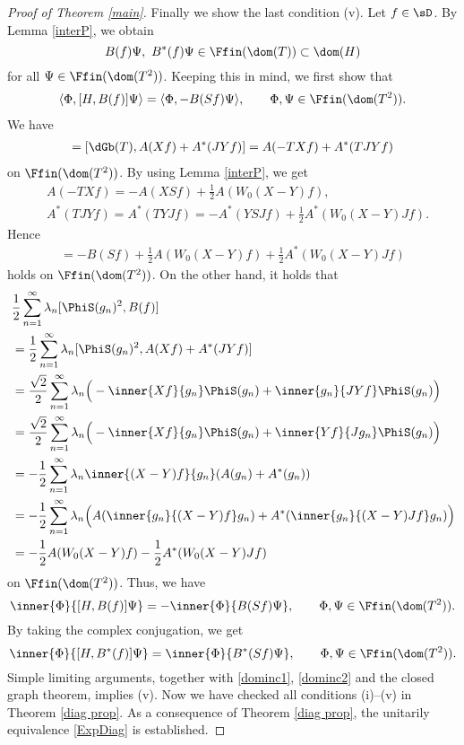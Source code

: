 \documentclass[12pt]{article}
\theoremstyle{plain}
\numberwithin{equation}{section}
\theoremstyle{remark}
\begin{document}
\begin{proof}[Proof of Theorem \ref{main}]
Finally we show the last condition (v). 
Let $f\in\sD $.
By Lemma \ref{interP}, we obtain 
\[
B(f)\Psi,\ B^*(f)\Psi\in\Ffin(\dom(T))\subset\dom(H)
\]
for all $\Psi\in\Ffin(\dom(T^2))$.
Keeping this in mind, we first show that
\begin{align*}
  \langle\Phi,[H,B(f)]\Psi\rangle = \langle\Phi,-B(Sf)\Psi\rangle, \qquad\Phi,\Psi\in\Ffin(\dom(T^2)).
\end{align*} 
We have
\begin{align*}
 [\dGb(T),B(f)] 
= [\dGb(T),A(Xf)+A^*(JYf)] 
= A(-TXf)+A^*(TJYf) 
\end{align*}
on $\Ffin(\dom(T^2))$.
By using Lemma \ref{interP}, we get
\begin{align*}
&  A(-TXf) = -A(XSf) + \frac{1}{2}A(W_0(X-Y)f), \\
&  A^*(TJYf) = A^*(TYJf) = -A^*(YSJf) + \frac{1}{2}A^*(W_0(X-Y)Jf).
\end{align*}
Hence
\begin{align*}
 [\dGb(T),B(f)] 
 = -B(Sf) + \frac{1}{2}A(W_0(X-Y)f) + \frac{1}{2}A^*(W_0(X-Y)Jf)
\end{align*}
holds on $\Ffin(\dom(T^2))$. On the other hand, it holds that
\begin{align*}
&\frac{1}{2}\sum_{n=1}^\infty\lambda_n [\PhiS(g_n)^2,B(f)] \\
&= \frac{1}{2}\sum_{n=1}^\infty\lambda_n [\PhiS(g_n)^2,A(Xf)+A^*(JYf)] \\
&= \frac{\sqrt{2}}{2} \sum_{n=1}^\infty\lambda_n \Big( -\inner{Xf}{g_n}\PhiS(g_n) + \inner{g_n}{JYf}\PhiS(g_n) \Big) \\
&= \frac{\sqrt{2}}{2} \sum_{n=1}^\infty\lambda_n \Big( -\inner{Xf}{g_n}\PhiS(g_n) + \inner{Yf}{Jg_n}\PhiS(g_n) \Big) \\
&= -\frac{1}{2} \sum_{n=1}^\infty\lambda_n \inner{(X-Y)f}{g_n} (A(g_n)+A^*(g_n)) \\
&= -\frac{1}{2}\sum_{n=1}^\infty\lambda_n \Big( A(\inner{g_n}{(X-Y)f}g_n) 
   + A^*(\inner{g_n}{(X-Y)Jf}g_n) \Big) \\
&= -\frac{1}{2}A(W_0(X-Y)f)-\frac{1}{2}A^*(W_0(X-Y)Jf)
\end{align*}
on $\Ffin(\dom(T^2))$. Thus, we have
\begin{equation*}
  \inner{\Phi}{[H,B(f)]\Psi} = -\inner{\Phi}{B(Sf)\Psi}, 
  \qquad {\Phi,\Psi} \in\Ffin(\dom(T^2)).
\end{equation*}
By taking the complex conjugation, we get
\begin{equation*}
  \inner{\Phi}{[H,B^*(f)]\Psi} = \inner{\Phi}{B^*(Sf)\Psi}, \qquad {\Phi,\Psi} \in\Ffin(\dom(T^2)).
\end{equation*}
Simple limiting arguments, together with \eqref{dominc1}, \eqref{dominc2} and the closed graph theorem, implies (v).
Now we have checked all conditions (i)--(v) in Theorem \ref{diag prop}.
As a consequence of Theorem \ref{diag prop}, the unitarily equivalence \eqref{ExpDiag} is established.
\end{proof}
\end{document}
